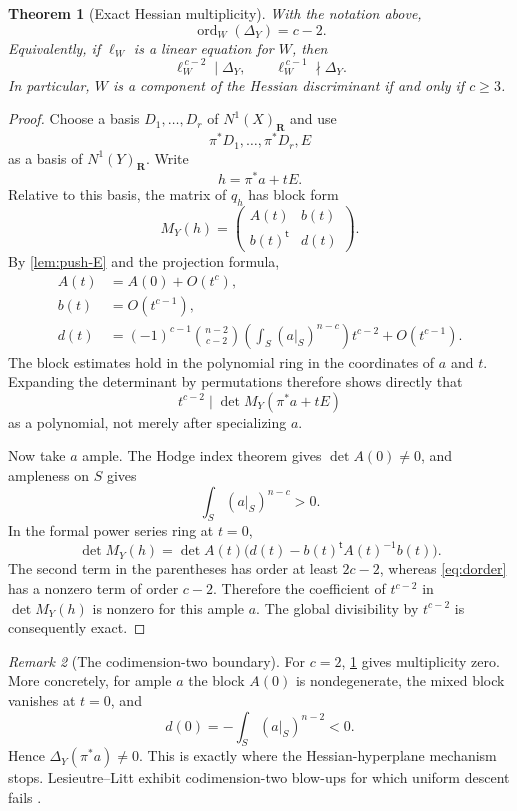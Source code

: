 \documentclass[11pt,reqno]{amsart}
\newcommand{\R}{\mathbf R}
\DeclareMathOperator{\ord}{ord}
\newtheorem{theorem}{Theorem}[section]
\theoremstyle{remark}
\newtheorem{remark}[theorem]{Remark}
\begin{document}
\begin{theorem}[Exact Hessian multiplicity]\label{thm:multiplicity}
With the notation above,
\[
 \boxed{\ord_W(\Delta_Y)=c-2.}
\]
Equivalently, if $\ell_W$ is a linear equation for $W$, then
\[
 \ell_W^{\,c-2}\mid\Delta_Y,
 \qquad
 \ell_W^{\,c-1}\nmid\Delta_Y.
\]
In particular, $W$ is a component of the Hessian discriminant if and only if $c\ge3$.
\end{theorem}

\begin{proof}
Choose a basis $D_1,\ldots,D_r$ of $N^1(X)_{\R}$ and use
\[
 \pi^*D_1,\ldots,\pi^*D_r,E
\]
as a basis of $N^1(Y)_{\R}$.  Write
\[
 h=\pi^*a+tE.
\]
Relative to this basis, the matrix of $q_h$ has block form
\[
 M_Y(h)=
 \begin{pmatrix}
   A(t)&b(t)\\
   b(t)^{\mathsf t}&d(t)
 \end{pmatrix}.
\]
By \cref{lem:push-E} and the projection formula,
\begin{align}
 A(t)&=A(0)+O(t^c),\label{eq:Aorder}\\
 b(t)&=O(t^{c-1}),\label{eq:border}\\
 d(t)&=(-1)^{c-1}\binom{n-2}{c-2}
       \left(\int_S(a|_S)^{n-c}\right)t^{c-2}
       +O(t^{c-1}).\label{eq:dorder}
\end{align}
The block estimates hold in the polynomial ring in the coordinates of $a$ and $t$.  Expanding the determinant by permutations therefore shows directly that
\[
 t^{c-2}\mid \det M_Y(\pi^*a+tE)
\]
as a polynomial, not merely after specializing $a$.

Now take $a$ ample.  The Hodge index theorem gives $\det A(0)\ne0$, and ampleness on $S$ gives
\[
 \int_S(a|_S)^{n-c}>0.
\]
In the formal power series ring at $t=0$,
\[
 \det M_Y(h)
 =\det A(t)\bigl(d(t)-b(t)^{\mathsf t}A(t)^{-1}b(t)\bigr).
\]
The second term in the parentheses has order at least $2c-2$, whereas \eqref{eq:dorder} has a nonzero term of order $c-2$.  Therefore the coefficient of $t^{c-2}$ in $\det M_Y(h)$ is nonzero for this ample $a$.  The global divisibility by $t^{c-2}$ is consequently exact.
\end{proof}

\begin{remark}[The codimension-two boundary]\label{rem:c2}
For $c=2$, \cref{thm:multiplicity} gives multiplicity zero.  More concretely, for ample $a$ the block $A(0)$ is nondegenerate, the mixed block vanishes at $t=0$, and
\[
 d(0)=-\int_S(a|_S)^{n-2}<0.
\]
Hence $\Delta_Y(\pi^*a)\ne0$.  This is exactly where the Hessian-hyperplane mechanism stops.  Lesieutre--Litt exhibit codimension-two blow-ups for which uniform descent fails \cite[Example~2.5]{LesieutreLitt2019}.
\end{remark}
\end{document}
